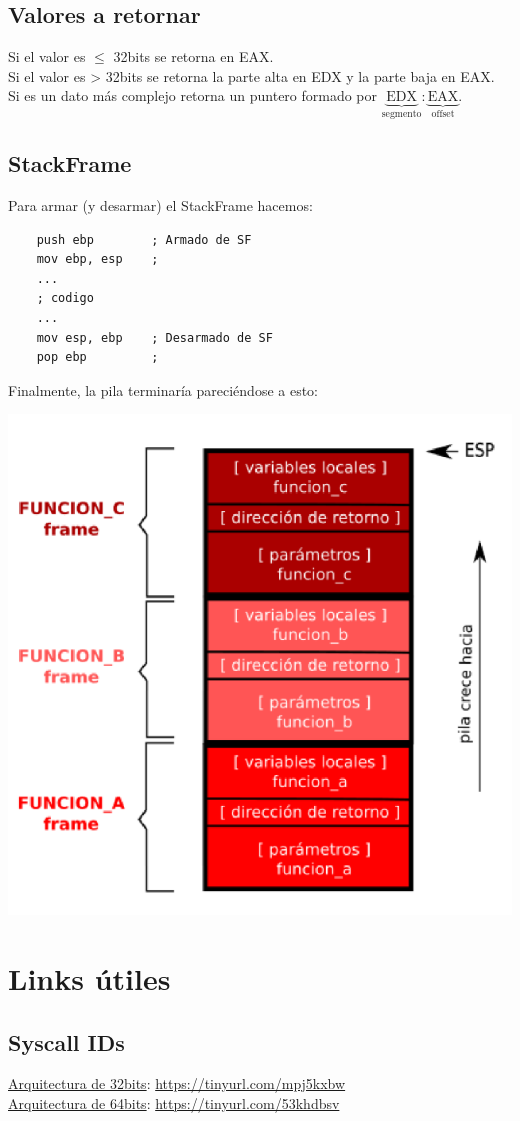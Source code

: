 \documentclass{article}
\begin{document}
\subsection{Valores a retornar}
Si el valor es $\leq$ 32bits se retorna en EAX.
\\Si el valor es > 32bits se retorna la parte alta en EDX y la parte baja en EAX.
\\Si es un dato más complejo retorna un puntero formado por $\underbrace{\text{EDX}}_{\text{segmento}}:\underbrace{\text{EAX}}_{\text{offset}}$.

\newpage
\subsection{StackFrame}
Para armar (y desarmar) el StackFrame hacemos:
\begin{verbatim}
    push ebp        ; Armado de SF
    mov ebp, esp    ;
    ...
    ; codigo
    ...
    mov esp, ebp    ; Desarmado de SF
    pop ebp         ; 
\end{verbatim}

Finalmente, la pila terminaría pareciéndose a esto:
\begin{center}
    \includegraphics[width=.40\textwidth]{Images/StackFrame.png}
\end{center}   
\newpage
\section{Links útiles}
\subsection{Syscall IDs}
\underline{Arquitectura de 32bits}: \url{https://tinyurl.com/mpj5kxbw}
\\\underline{Arquitectura de 64bits}: \url{https://tinyurl.com/53khdbsv}
\end{document}
